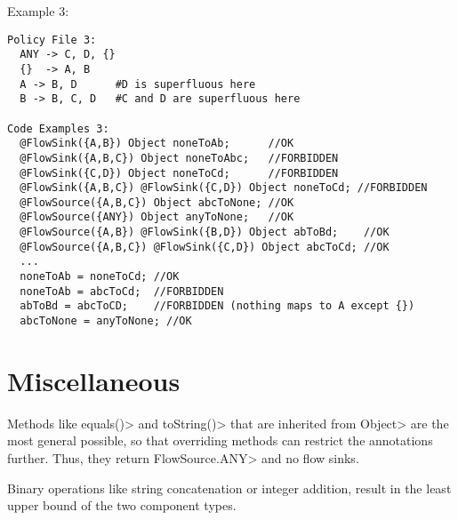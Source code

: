 Example 3:
\begin{Verbatim}
Policy File 3:
  ANY -> C, D, {}
  {}  -> A, B
  A -> B, D      #D is superfluous here
  B -> B, C, D   #C and D are superfluous here

Code Examples 3:
  @FlowSink({A,B}) Object noneToAb;      //OK
  @FlowSink({A,B,C}) Object noneToAbc;   //FORBIDDEN
  @FlowSink({C,D}) Object noneToCd;      //FORBIDDEN
  @FlowSink({A,B,C}) @FlowSink({C,D}) Object noneToCd; //FORBIDDEN
  @FlowSource({A,B,C}) Object abcToNone; //OK
  @FlowSource({ANY}) Object anyToNone;   //OK
  @FlowSource({A,B}) @FlowSink({B,D}) Object abToBd;    //OK
  @FlowSource({A,B,C}) @FlowSink({C,D}) Object abcToCd; //OK
  ...
  noneToAb = noneToCd; //OK
  noneToAb = abcToCd;  //FORBIDDEN
  abToBd = abcToCD;    //FORBIDDEN (nothing maps to A except {})
  abcToNone = anyToNone; //OK
\end{Verbatim}

\section{Miscellaneous}

Methods like \<equals()> and \<toString()> that are inherited from
\<Object> are the most general possible, so that overriding methods
can restrict the annotations further. Thus, they
return \<FlowSource.ANY> and no flow sinks.

Binary operations like string concatenation or integer addition,
result in the least upper bound of the two component types.





